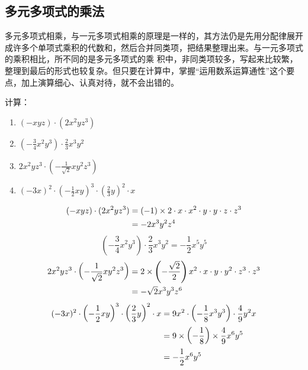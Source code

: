 \subsection{多元多项式的乘法}
多元多项式相乘，与一元多项式相乘的原理是一样的，其方法仍是先用分配律展开成许多个单项式乘积的代数和，然后合并同类项，把结果整理出来。与一元多项式的乘积相比，所不同的是多元多项式的乘
积中，非同类项较多，写起来比较繁，整理到最后的形式也较复杂。但只要在计算中，掌握“运用数系运算通性”这个要点，加上演算细心、认真对待，就不会出错的。

\begin{example}
    计算：
     \begin{multicols}{2}
\begin{enumerate}
    \item $(-xyz)\cdot (2x^2yz^3)$
    \item $\left(-\frac{3}{4}x^2y^3\right)\cdot \frac{2}{3}x^3y^2$
    \item $2x^2yz^3\cdot \left(-\frac{1}{\sqrt{2}}xy^2z^3\right)$
    \item $(-3x)^2\cdot \left(-\frac{1}{2}xy\right)^3\cdot \left(\frac{2}{3}y\right)^2\cdot x$
\end{enumerate}
\end{multicols}
\end{example}

\begin{solution}
\[\begin{split}
        (-xyz)\cdot (2x^2yz^3)&=(-1)\times 2\cdot x\cdot x^2\cdot y\cdot y\cdot z\cdot z^3\\
        &=-2x^3y^2z^4
    \end{split}\]
\[\left(-\frac{3}{4}x^2y^3\right)\cdot \frac{2}{3}x^3y^2=-\frac{1}{2}x^5y^5\]
 \[\begin{split}
       2x^2yz^3\cdot \left(-\dfrac{1}{\sqrt{2}}xy^2z^3\right)
&=2\times\left(-\dfrac{\sqrt{2}}{2}\right)x^2\cdot x\cdot y\cdot y^2\cdot z^3\cdot z^3\\
&=-\sqrt{2}x^3y^3z^6
    \end{split}\]
\[\begin{split}
       (-3x)^2\cdot \left(-\dfrac{1}{2}xy\right)^3\cdot \left(\dfrac{2}{3}y\right)^2\cdot x
        &=9x^2\cdot \left(-\dfrac{1}{8}x^3y^3\right)\cdot \dfrac{4}{9}y^2x\\
        &=9\times \left(-\dfrac{1}{8}\right)\times \dfrac{4}{9}x^6y^5\\
        &=-\dfrac{1}{2}x^6y^5
    \end{split}\]
\end{solution}

